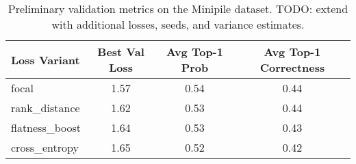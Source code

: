 \begin{table}[ht]
    \centering
    \begin{tabular}{lccc}
        \toprule
        Loss Variant & Best Val Loss & Avg Top-1 Prob & Avg Top-1 Correctness \\
        \midrule
        focal & 1.57 & 0.54 & 0.44 \\
        rank\_distance & 1.62 & 0.53 & 0.44 \\
        flatness\_boost & 1.64 & 0.53 & 0.43 \\
        cross\_entropy & 1.65 & 0.52 & 0.42 \\
        \bottomrule
    \end{tabular}
    \caption{Preliminary validation metrics on the Minipile dataset. TODO: extend with additional losses, seeds, and variance estimates.}
    \label{tab:results}
\end{table}
